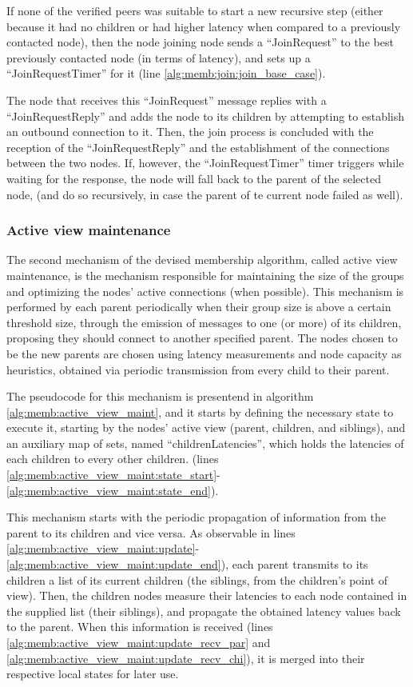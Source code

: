 If none of the verified peers was suitable to start a new recursive step (either because it had no children or had higher latency when compared to a previously contacted node), then the node joining node sends a ``JoinRequest'' to the best previously contacted node (in terms of latency), and sets up a ``JoinRequestTimer'' for it  (line \ref{alg:memb:join:join_base_case}). 

The node that receives this ``JoinRequest'' message replies with a ``JoinRequestReply'' and adds the node to its children by attempting to establish an outbound connection to it. Then, the join process is concluded with the reception of the ``JoinRequestReply'' and the establishment of the connections between the two nodes. If, however, the ``JoinRequestTimer'' timer triggers while waiting for the response, the node will fall back to the parent of the selected node, (and do so recursively, in case the parent of te current node failed as well).

\subsubsection{Active view maintenance} \label{sec:overlay_network:active_view_maint}

The second mechanism of the devised membership algorithm, called active view maintenance, is the mechanism responsible for maintaining the size of the groups and optimizing the nodes' active connections (when possible). This mechanism is performed by each parent periodically when their group size is above a certain threshold size, through the emission of messages to one (or more) of its children, proposing they should connect to another specified parent. The nodes chosen to be the new parents are chosen using latency measurements and node capacity as heuristics, obtained via periodic transmission from every child to their parent. 

The pseudocode for this mechanism is presentend in algorithm \ref{alg:memb:active_view_maint}, and it starts by defining the necessary state to execute it, starting by the nodes' active view (parent, children, and siblings), and an auxiliary map of sets, named ``childrenLatencies'', which holds the latencies of each children to every other children. (lines \ref{alg:memb:active_view_maint:state_start}-\ref{alg:memb:active_view_maint:state_end}). 



This mechanism starts with the periodic propagation of information from the parent to its children and vice versa. As observable in lines \ref{alg:memb:active_view_maint:update}-\ref{alg:memb:active_view_maint:update_end}), each parent transmits to its children a list of its current children (the siblings, from the children's point of view). Then, the children nodes measure their latencies to each node contained in the supplied list (their siblings), and propagate the obtained latency values back to the parent. When this information is received (lines \ref{alg:memb:active_view_maint:update_recv_par} and \ref{alg:memb:active_view_maint:update_recv_chi}), it is merged into their respective local states for later use.

